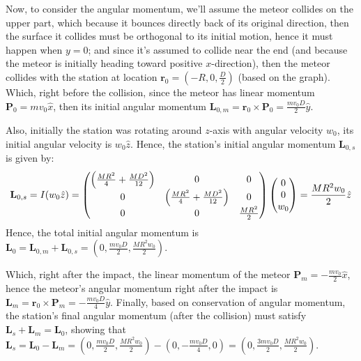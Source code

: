\documentclass{article}
\DeclarePairedDelimiter{\paran}{(}{)}%
\newcommand{\br}{\textbf{r}} %
\newcommand{\bP}{\textbf{P}} %
\newcommand{\bL}{\textbf{L}} %
\begin{document}
\hfil

Now, to consider the angular momentum, we'll assume the meteor collides on the upper part, which because it bounces directly back of its original direction, then the surface it collides must be orthogonal to its initial motion, hence it must happen when $y=0$; and since it's assumed to collide near the end (and because the meteor is initially heading toward positive $x$-direction), then the meteor collides with the station at location $\br_0=(-R, 0, \frac{D}{2})$ (based on the graph). Which, right before the collision, since the meteor has linear momentum $\bP_0 = mv_0\hat{x}$, then its initial angular momentum $\bL_{0,m} = \br_0\times \bP_0 = \frac{mv_0D}{2}\hat{y}$.

Also, initially the station was rotating around $z$-axis with angular velocity $w_0$, its initial angular velocity is $w_0\hat{z}$. Hence, the station's initial angular momentum $\bL_{0,s}$ is given by:
\begin{align}
    \bL_{0,s}=I(w_0\hat{z}) = \begin{pmatrix}
        \paran*{\frac{MR^2}{4}+\frac{MD^2}{12}}&0&0\\
        0&\paran*{\frac{MR^2}{4}+\frac{MD^2}{12}}&0\\
        0&0& \frac{MR^2}{2}
    \end{pmatrix}\begin{pmatrix}
        0\\0\\w_0
    \end{pmatrix} = \frac{MR^2w_0}{2}\hat{z}
\end{align}
Hence, the total initial angular momentum is $\bL_0 = \bL_{0,m}+\bL_{0,s} = (0,\frac{mv_0D}{2},\frac{MR^2w_0}{2})$.

Which, right after the impact, the linear momentum of the meteor $\bP_m = -\frac{mv_0}{2}\hat{x}$, hence the meteor's angular momentum right after the impact is $\bL_m = \br_0\times \bP_m = -\frac{mv_0D}{4}\hat{y}$. Finally, based on conservation of angular momentum, the station's final angular momentum (after the collision) must satisfy $\bL_s+\bL_m=\bL_0$, showing that $\bL_s = \bL_0-\bL_m = (0,\frac{mv_0D}{2}, \frac{MR^2w_0}{2})-(0,-\frac{mv_0D}{4},0) = (0,\frac{3mv_0D}{2},\frac{MR^2w_0}{2})$.
\end{document}
